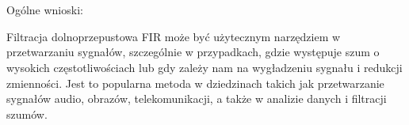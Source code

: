 \documentclass[11pt]{article}
\begin{document}
    \begin{center}
    \end{center}
    { \hspace*{\fill} \\}
    
    \begin{center}
    \end{center}
    { \hspace*{\fill} \\}
    
    Ogólne wnioski:

Filtracja dolnoprzepustowa FIR może być użytecznym narzędziem w
przetwarzaniu sygnałów, szczególnie w przypadkach, gdzie występuje szum
o wysokich częstotliwościach lub gdy zależy nam na wygładzeniu sygnału i
redukcji zmienności. Jest to popularna metoda w dziedzinach takich jak
przetwarzanie sygnałów audio, obrazów, telekomunikacji, a także w
analizie danych i filtracji szumów.


    
    
    
\end{document}
